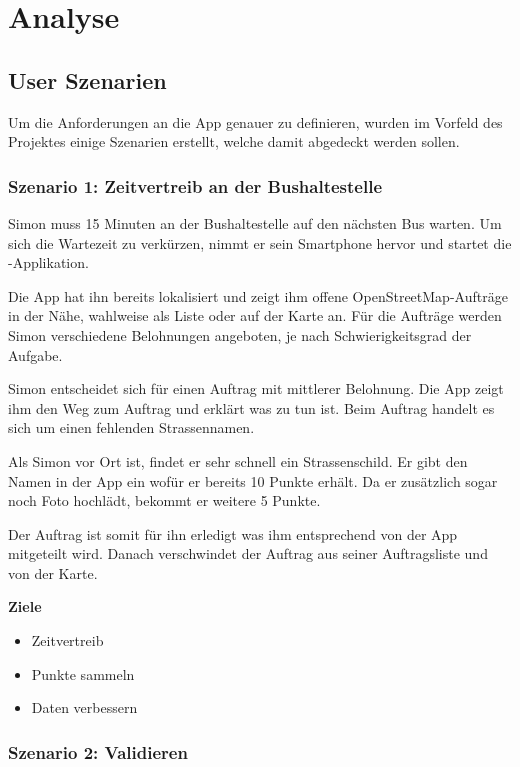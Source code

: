 \section{Analyse}

\subsection{User Szenarien}
\label{kort-user-szenarien}

Um die Anforderungen an die App genauer zu definieren, wurden im Vorfeld des Projektes einige Szenarien erstellt, welche damit abgedeckt werden sollen.

\subsubsection{Szenario 1: Zeitvertreib an der Bushaltestelle}

Simon muss 15 Minuten an der Bushaltestelle auf den nächsten Bus warten.
Um sich die Wartezeit zu verkürzen, nimmt er sein Smartphone hervor und startet die \kort-Applikation.

Die App hat ihn bereits lokalisiert und zeigt ihm offene \gls{OpenStreetMap}-Aufträge in der Nähe, wahlweise als Liste oder auf der Karte an.
Für die Aufträge werden Simon verschiedene Belohnungen angeboten, je nach Schwierigkeitsgrad der Aufgabe.

Simon entscheidet sich für einen Auftrag mit mittlerer Belohnung.
Die App zeigt ihm den Weg zum Auftrag und erklärt was zu tun ist. Beim Auftrag handelt es sich um einen fehlenden Strassennamen.

Als Simon vor Ort ist, findet er sehr schnell ein Strassenschild.
Er gibt den Namen in der App ein wofür er bereits 10 Punkte erhält.
Da er zusätzlich sogar noch Foto hochlädt, bekommt er weitere 5 Punkte.

Der Auftrag ist somit für ihn erledigt was ihm entsprechend von der App mitgeteilt wird.
Danach verschwindet der Auftrag aus seiner Auftragsliste und von der Karte.

\textbf{Ziele}
\begin{itemize}
\item Zeitvertreib
\item Punkte sammeln
\item Daten verbessern
\end{itemize}

\subsubsection{Szenario 2: Validieren}

